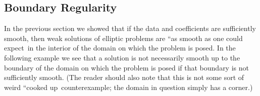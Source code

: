 \subsection{Boundary Regularity}\label{sec:elliptic-boundary-regularity}

In the previous section we showed that if the data and coefficients are sufficiently smooth, then weak solutions of elliptic problems are ``as smooth as one could expect\textquotesingle\textquotesingle\ in the interior of the domain on which the problem is posed. In the following example we see that a solution is not necessarily smooth up to the boundary of the domain on which the problem is posed if that boundary is not sufficiently smooth. (The reader should also note that this is not some sort of weird ``cooked up\textquotesingle\textquotesingle\ counterexample; the domain in question simply has a corner.)

